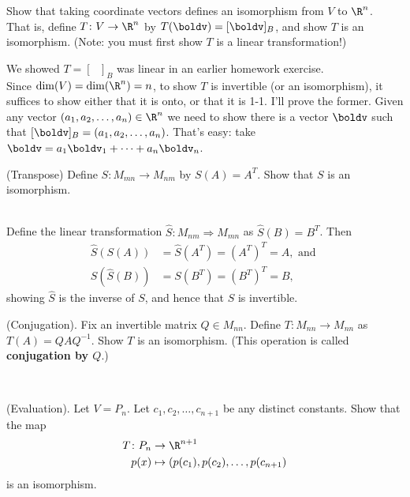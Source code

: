 Show that taking coordinate vectors defines an isomorphism from $V$ to $\R^n$. 
\\
That is, define $T\colon V\rightarrow \R^n$ by $T(\boldv)=[\boldv]_B$, and show $T$ is an isomorphism. (Note: you must first show $T$ is a linear transformation!) 
\\
\begin{solution}
\noindent We showed $T=[\hspace{8pt}]_B$ was linear in an earlier homework exercise. 
\\
Since $\dim(V)=\dim(\R^n)=n$, to show $T$ is invertible (or an isomorphism), it suffices to show either that it is onto, or that it is 1-1. I'll prove the former. Given any vector $(a_1,a_2,\dots, a_n)\in\R^n$ we need to show there is a vector $\boldv$ such that $[\boldv]_B=(a_1,a_2,\dots, a_n)$. That's easy: take $\boldv=a_1\boldv_1+\cdots +a_n\boldv_n$. 

\end{solution}

\ii (Transpose) Define $S\colon M_{mn}\rightarrow M_{nm}$ by $S(A)=A^T$. Show that $S$ is an isomorphism. 
\begin{solution}
\ \\
Define the linear transformation $\hat{S}\colon M_{nm}\Rightarrow M_{mn}$ as $\hat{S}(B)=B^T$. Then 
\begin{align*}
\hat{S}(S(A))&=\hat{S}(A^T)=(A^T)^T=A, \text{ and }\\
S(\hat{S}(B))&=S(B^T)=(B^T)^T=B,
\end{align*} 
showing $\hat{S}$ is the inverse of $S$, and hence that $S$ is invertible. 
\end{solution}
\ii (Conjugation). Fix an invertible matrix $Q\in M_{nn}$. Define $T\colon M_{nn}\rightarrow M_{nn}$ as $T(A)=QAQ^{-1}$. Show $T$ is an isomorphism. (This operation is called {\bf conjugation by $Q$}.) 
\\
\begin{solution}
\ \\
\end{solution}
\ii (Evaluation). Let $V=P_n$. Let $c_1,c_2,\dots, c_{n+1}$ be any distinct constants. Show that the map 
\begin{align*}
T\colon P_n&\rightarrow \R^{n+1}\\
p(x)&\mapsto (p(c_1), p(c_2), \dots, p(c_{n+1})
\end{align*}
is an isomorphism. 

